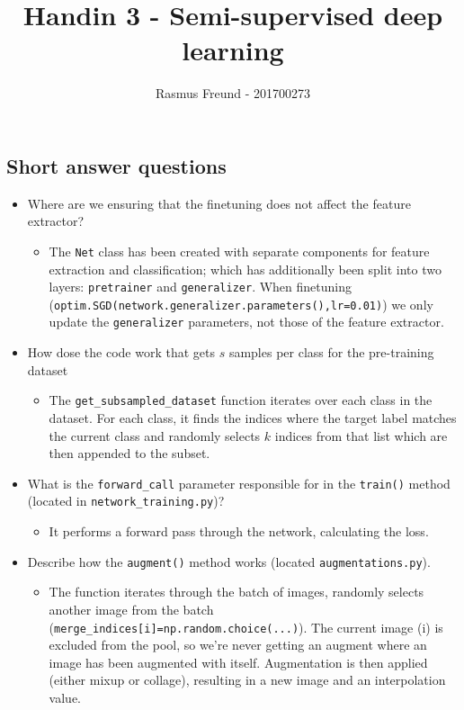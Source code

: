 \documentclass[english,11pt,a4paper,titlepage]{report}
\title{Handin 3 - Semi-supervised deep learning}
\author{Rasmus Freund - 201700273}
\begin{document}
	\maketitle
	\subsection*{Short answer questions}	
	\begin{itemize}
		\item Where are we ensuring that the finetuning does not affect the feature extractor?
		\begin{itemize}
			\item The \verb*|Net| class has been created with separate components for feature extraction and classification; which has additionally been split into two layers: \verb*|pretrainer| and \verb*|generalizer|. When finetuning (\verb*|optim.SGD(network.generalizer.parameters(),lr=0.01)|) we only update the \verb*|generalizer| parameters, not those of the feature extractor.  
		\end{itemize}
		\item How dose the code work that gets $s$ samples per class for the pre-training dataset
		\begin{itemize}
			\item The \verb*|get_subsampled_dataset| function iterates over each class in the dataset. For each class, it finds the indices where the target label matches the current class and randomly selects $k$ indices from that list which are then appended to the subset.
		\end{itemize}
		\item What is the \verb*|forward_call| parameter responsible for in the \verb*|train()| method (located in \verb*|network_training.py|)?
		\begin{itemize}
			\item It performs a forward pass through the network, calculating the loss.
		\end{itemize}
		\item Describe how the \verb*|augment()| method works (located \verb*|augmentations.py|).
		\begin{itemize}
			\item The function iterates through the batch of images, randomly selects another image from the batch \\(\verb*|merge_indices[i]=np.random.choice(...)|). The current image (i) is excluded from the pool, so we're never getting an augment where an image has been augmented with itself. Augmentation is then applied (either mixup or collage), resulting in a new image and an interpolation value.

\end{itemize}
\end{itemize}
\end{document}
